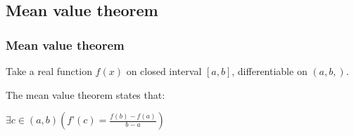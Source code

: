 
\subsection{Mean value theorem}

\subsubsection{Mean value theorem}

Take a real function \(f(x)\) on closed interval \([a,b]\), differentiable on \((a,b,)\).

The mean value theorem states that:

\(\exists c\in(a,b) (f’(c)=\frac{f(b)-f(a)}{b-a})\)

